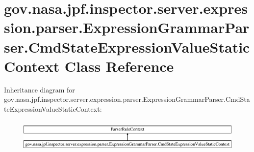 \hypertarget{classgov_1_1nasa_1_1jpf_1_1inspector_1_1server_1_1expression_1_1parser_1_1_expression_grammar_pa08e6165e66cacb4d3382a343315ee767}{}\section{gov.\+nasa.\+jpf.\+inspector.\+server.\+expression.\+parser.\+Expression\+Grammar\+Parser.\+Cmd\+State\+Expression\+Value\+Static\+Context Class Reference}
\label{classgov_1_1nasa_1_1jpf_1_1inspector_1_1server_1_1expression_1_1parser_1_1_expression_grammar_pa08e6165e66cacb4d3382a343315ee767}
Inheritance diagram for gov.\+nasa.\+jpf.\+inspector.\+server.\+expression.\+parser.\+Expression\+Grammar\+Parser.\+Cmd\+State\+Expression\+Value\+Static\+Context\+:\begin{figure}[H]
\begin{center}
\leavevmode
\includegraphics[height=1.664190cm]{classgov_1_1nasa_1_1jpf_1_1inspector_1_1server_1_1expression_1_1parser_1_1_expression_grammar_pa08e6165e66cacb4d3382a343315ee767}
\end{center}
\end{figure}
